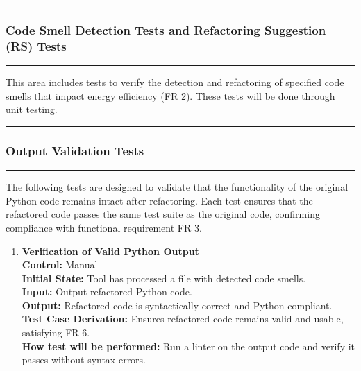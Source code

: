 \documentclass[12pt, titlepage]{article}
\newcommand{\colorrule}{\textcolor{BlueViolet}{\rule{\linewidth}{2pt}}}
\begin{document}
\begin{enumerate}[label={\bf \textcolor{Maroon}{test-FR-IA-\arabic*}}, wide=0pt, font=\itshape]
\noindent
\colorrule

\subsubsection{Code Smell Detection Tests and Refactoring Suggestion (RS) Tests} \label{4.1.2}
\colorrule

\medskip

\noindent
This area includes tests to verify the detection and refactoring of specified code 
smells that impact energy efficiency (FR 2). These tests will be done through unit testing.

\end{enumerate}

\noindent
\colorrule

\subsubsection{Output Validation Tests}
\colorrule

\medskip

\noindent
The following tests are designed to validate that the functionality of the original Python code remains intact after refactoring. Each test ensures that the refactored code passes the same test suite as the original code, confirming compliance with functional requirement FR 3.
		
\begin{enumerate}[label={\bf \textcolor{Maroon}{test-FR-OV-\arabic*}}, wide=0pt, font=\itshape]  
  \label{itm:FR-OV-1}
  \item \textbf{Verification of Valid Python Output}\\[2mm]
    \textbf{Control:} Manual \\
    \textbf{Initial State:} Tool has processed a file with detected code smells.\\
    \textbf{Input:} Output refactored Python code.\\
    \textbf{Output:} Refactored code is syntactically correct and Python-compliant.\\[2mm]
    \textbf{Test Case Derivation:} Ensures refactored code remains valid and usable, satisfying FR 6.\\[2mm]
    \textbf{How test will be performed:} Run a linter on the output code and verify it passes without syntax errors.
  
\end{enumerate}

\newpage
\end{document}
